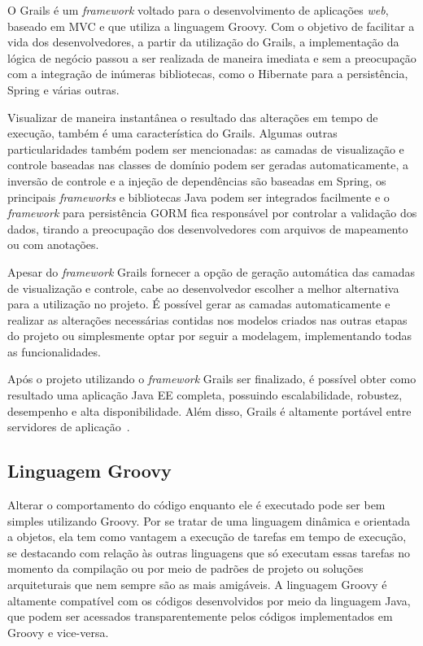 O Grails é um \textit{framework} voltado para o desenvolvimento de aplicações \textit{web}, baseado em MVC e que utiliza a linguagem Groovy. Com o objetivo de facilitar a vida dos desenvolvedores, a partir da utilização do Grails, a implementação da lógica de negócio passou a ser realizada de maneira imediata e sem a preocupação com a integração de inúmeras bibliotecas, como o Hibernate para a persistência, Spring e várias outras.

Visualizar de maneira instantânea o resultado das alterações em tempo de execução, também é uma característica do Grails. Algumas outras particularidades também podem ser mencionadas: as camadas de visualização e controle baseadas nas classes de domínio podem ser geradas automaticamente, a inversão de controle e a injeção de dependências são baseadas em Spring, os principais \textit{frameworks} e bibliotecas Java podem ser integrados facilmente e o \textit{framework} para persistência GORM fica responsável por controlar a validação dos dados, tirando a preocupação dos desenvolvedores com arquivos de mapeamento ou com anotações.

Apesar do \textit{framework} Grails fornecer a opção de geração automática das camadas de visualização e controle, cabe ao desenvolvedor escolher a melhor alternativa para a utilização no projeto. É possível gerar as camadas automaticamente e realizar as alterações necessárias contidas nos modelos criados nas outras etapas do projeto ou simplesmente optar por seguir a modelagem, implementando todas as funcionalidades.      

Após o projeto utilizando o \textit{framework} Grails ser finalizado, é possível obter como resultado uma aplicação Java EE completa, possuindo escalabilidade, robustez, desempenho e alta disponibilidade. Além disso, Grails é altamente portável entre servidores de aplicação~\cite{weissmann:fgapdw15}.       


\subsection{Linguagem Groovy}
\label{sec-ref-linguagem-groovy}


Alterar o comportamento do código enquanto ele é executado pode ser bem simples utilizando Groovy. Por se tratar de uma linguagem dinâmica e orientada a objetos, ela tem como vantagem a execução de tarefas em tempo de execução, se destacando com relação às outras linguagens que só executam essas tarefas no momento da compilação ou por meio de padrões de projeto ou soluções arquiteturais que nem sempre são as mais amigáveis. A linguagem Groovy é altamente compatível com os códigos desenvolvidos por meio da linguagem Java, que podem ser acessados transparentemente pelos códigos implementados em Groovy e vice-versa.

